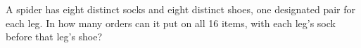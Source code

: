A spider has eight distinct socks and eight distinct shoes, one designated pair for each leg. In how many orders can it put on all 16 items, with each leg's sock before that leg's shoe?
